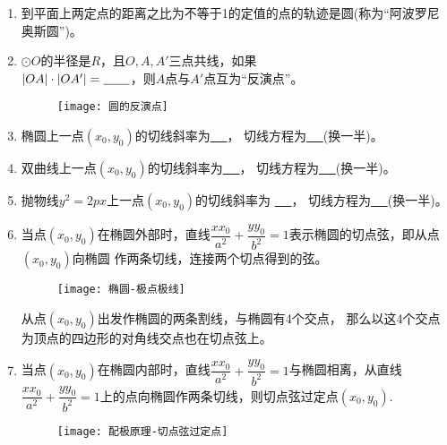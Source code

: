 \documentclass{article}
\newif\ifte
\begin{document}
\begin{multicols}{2}
\begin{enumerate}[leftmargin=20pt]
\item 到平面上两定点的距离之比为不等于1的定值的点的轨迹是圆(称为“阿波罗尼奥斯圆”)。

\item $ \odot O $的半径是$ R $，且$ O,A,A' $三点共线，如果 \\ 
$ |OA|\cdot |OA'|=\underline{\ \ifte R^2\else 
 \hspace{0.5cm} \fi\ } $，则$ A $点与$ A' $点互为“反演点”。
\begin{figure}[H]
    \centering
    \texttt{[image: 圆的反演点]}
\end{figure}

\item 椭圆上一点$ (x_0,y_0) $的切线斜率为\underline{\ \ifte 
    $ -\dfrac{b^2x_0}{a^2y_0} $\else \hspace{1cm} \fi\ }，
切线方程为\underline{\ \ifte $ \dfrac{xx_0}{a^2}+\dfrac{yy_0}{b^2}=1 $
    \else \hspace{2cm} \fi\ }(换一半)。

\item 双曲线上一点$ (x_0,y_0) $的切线斜率为\underline{\ \ifte
    $ \dfrac{b^2x_0}{a^2y_0} $  \else \hspace{1cm} \fi\ }，
切线方程为\underline{\ \ifte $ \dfrac{xx_0}{a^2}-
    \dfrac{yy_0}{b^2}=1 $\else \hspace{2cm} \fi\ }(换一半)。

\item 抛物线$ y^2=2px $上一点$ (x_0,y_0) $的切线斜率为
\underline{\ \ifte $ \dfrac{p}{y_0} $\else \hspace{1cm} \fi\ }，
切线方程为\underline{\ \ifte $ yy_0=p(x+x_0) $
    \else \hspace{2cm} \fi\ }(换一半)。

\item 当点$ (x_0,y_0) $在椭圆外部时，直线$ \dfrac{xx_0}{a^2}+
\dfrac{yy_0}{b^2}=1 $表示椭圆的切点弦，即从点$ (x_0,y_0) $向椭圆
作两条切线，连接两个切点得到的弦。
\begin{figure}[H]
    \centering
    \texttt{[image: 椭圆-极点极线]}
\end{figure}
从点$ (x_0,y_0) $出发作椭圆的两条割线，与椭圆有4个交点，
那么以这4个交点为顶点的四边形的对角线交点也在切点弦上。

\item 当点$ (x_0,y_0) $在椭圆内部时，直线$ \dfrac{xx_0}{a^2}+
\dfrac{yy_0}{b^2}=1 $与椭圆相离，从直线$ \dfrac{xx_0}{a^2}+
\dfrac{yy_0}{b^2}=1 $上的点向椭圆作两条切线，则切点弦过定点$ (x_0,y_0) $.
\begin{figure}[H]
    \centering
    \texttt{[image: 配极原理-切点弦过定点]}
\end{figure}


\end{enumerate}
\end{multicols}
\end{document}
